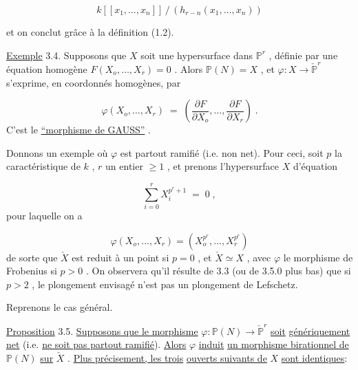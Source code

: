 \begin{equation}\tag{3.3.16}
k[[x_1,\dots,x_n]] \,/\, (h_{r-n}(x_1,\dots,x_n)) 
\end{equation}


 et on conclut grâce à la définition (1.2).

\underline{Exemple} 3.4. Supposons que $X$ soit une hypersurface dans $\mathbb{P}^r$ , définie par une équation homogène $F(X_o,\dots,X_r) = 0$ . Alors $\mathbb{P}(N) = X$ , et $\varphi : X \longrightarrow \check{\mathbb{P}}^r$ s'exprime, en coordonnés homogènes, par

\begin{equation}\tag{3.4.1}
\varphi(X_o,\dots,X_r) \;=\; \left( \frac{\partial F}{\partial X_o},\dots, \frac{\partial F}{\partial X_r} \right) \;.
\end{equation}
C'est le \underline{``morphisme de GAUSS''} .

Donnons un exemple où $\varphi$ est partout ramifié (i.e. non net). Pour ceci, soit $p$ la caractéristique de $k$ , $r$ un entier $\geqslant 1$ , et prenons l'hypersurface $X$ d'équation

\begin{equation}\tag{3.4.2}
\sum_{i=0}^{r} X_i^{p^r+1} \;=\; 0 \;,
\end{equation}
pour laquelle on a

\begin{equation}\tag{3.4.3}
\varphi(X_o,\dots,X_r) = (X_o^{p^r},\dots,X_r^{p^r})
\end{equation}
de sorte que $\check{X}$ est reduit à un point si $p = 0$ , et $\check{X} \simeq X$ , avec $\varphi$ le morphisme de Frobenius si $p > 0$ . On observera qu'il résulte de 3.3 (ou de 3.5.0 plus bas) que si $p > 2$ , le plongement envisagé n'est pas un plongement de Lefschetz.

Reprenons le cas général.



\underline{Proposition} 3.5. \underline{Supposons que le morphisme} $\varphi : \mathbb{P}(N) \longrightarrow \check{\mathbb{P}}^r$ \underline{soit} \underline{génériquement net} (i.e. \underline{ne soit pas partout ramifié}). \underline{Alors} $\varphi$ \underline{induit} \underline{un morphisme birationnel de} $\mathbb{P}(N)$ \underline{sur} $\check{X}$ . \underline{Plus précisement, les trois} \underline{ouverts suivants de} $X$ \underline{sont identiques}:

